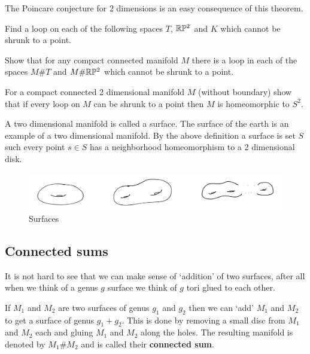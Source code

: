 The Poincare conjecture for 2 dimensions is an easy consequence of this theorem.

\begin{exercise}
	Find a loop on each of the following spaces $T$, $\mathbb{R}\mathbb{P}^2$ and $K$ which cannot be shrunk to a point.
\end{exercise}

\begin{exercise}
	Show that for any compact connected manifold $M$ there is a loop in each of the spaces $M \# T$ and $M \# \mathbb{R}\mathbb{P}^2$ which cannot be shrunk to a point.
\end{exercise}

\begin{exercise}
	For a compact connected 2 dimensional manifold $M$ (without boundary) show that if every loop on $M$ can be shrunk to a point then $M$ is homeomorphic to $S^2$.
\end{exercise}












\iffalse
A two dimensional manifold is called a surface. The surface of the earth is an example of a two dimensional manifold. By the above definition a surface is set $S$ such every point $s \in S$ has a neighborhood homeomorphism to a 2 dimensional disk.

\begin{figure}[H]
	\centering \includegraphics[width=0.85\linewidth]{images/GegusGSurfaces}
	\caption{Surfaces}
\end{figure}

\subsection{Connected sums}
It is not hard to see that we can make sense of `addition' of two surfaces, after all when we think of a genus $g$ surface we think of $g$ tori glued to each other.

If $M_1$ and $M_2$ are two surfaces of genus $g_1$ and $g_2$ then we can `add' $M_1$ and $M_2$ to get a surface of genus $g_1+ g_2$. This is done by removing a small disc from $M_1$ and $M_2$ each and gluing $M_1$ and $M_2$ along the holes. The resulting manifold is denoted by $M_1 \# M_2$ and is called their \textbf{connected sum}.

